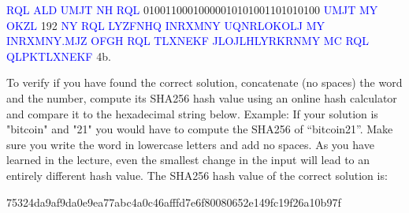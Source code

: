 \documentclass[12pt]{article}
\begin{document}
	\textcolor{blue}{RQL ALD UMJT NH RQL} 01001100010000010101001101010100 \textcolor{blue}{UMJT MY OKZL} 192 \textcolor{blue}{NY RQL LYZFNHQ INRXMNY UQNRLOKOLJ MY INRXMNY.MJZ OFGH RQL TLXNEKF JLOJLHLYRKRNMY MC RQL QLPKTLXNEKF }4b.\par
	
	\vspace{0.5cm}
	To verify if you have found the correct solution, concatenate (no spaces) the word and the number, compute its SHA256 hash value using an online hash calculator and compare it to the hexadecimal string below. Example: If your solution is "bitcoin" and "21" you would have to compute the SHA256 of ``bitcoin21''. Make sure you write the word in lowercase letters and add no spaces. As you have learned in the lecture, even the smallest change in the input will lead to an entirely different hash value. The SHA256 hash value of the correct solution is:
	\begin{center}
		75324da9af9da0e9ea77abc4a0c46afffd7e6f80080652e149fc19f26a10b97f %
	\end{center}
	
\end{document}
